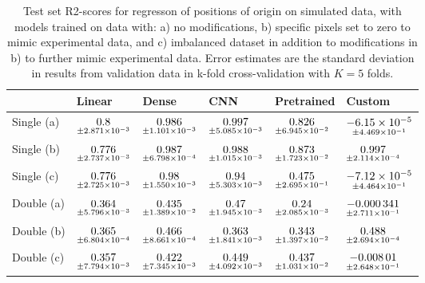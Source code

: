 \begin{table}
\centering
\caption{
Test set R2-scores for regresson of positions of origin on simulated data, with models trained on data with: 
a) no modifications, b) specific pixels set to zero to mimic experimental data, and c) imbalanced dataset
in addition to modifications in b) to further mimic experimental data. Error estimates are the standard deviation 
in results from validation data in k-fold cross-validation with $K=5$ folds.
}
\label{tab:regression-simulated-all-positions-r2}
\begin{tabular}{llllll}
\toprule
{} &                                              Linear &                                               Dense &                                                 CNN &                                          Pretrained &                                                  Custom \\
\midrule
Single (a) &  $\underset{\num{+- 2.871e-03 }  }{\num{ 0.8 } }$ &  $\underset{\num{+- 1.101e-03 }  }{\num{ 0.986 } }$ &  $\underset{\num{+- 5.085e-03 }  }{\num{ 0.997 } }$ &  $\underset{\num{+- 6.945e-02 }  }{\num{ 0.826 } }$ &  $\underset{\num{+- 4.469e-01 }  }{\num{ -6.15e-05 } }$ \\
Single (b) &  $\underset{\num{+- 2.737e-03 }  }{\num{ 0.776 } }$ &  $\underset{\num{+- 6.798e-04 }  }{\num{ 0.987 } }$ &  $\underset{\num{+- 1.015e-03 }  }{\num{ 0.988 } }$ &  $\underset{\num{+- 1.723e-02 }  }{\num{ 0.873 } }$ &  $\underset{\num{+- 2.114e-04 }  }{\num{ 0.997 } }$ \\
Single (c) &  $\underset{\num{+- 2.725e-03 }  }{\num{ 0.776 } }$ &  $\underset{\num{+- 1.550e-03 }  }{\num{ 0.98 } }$ &  $\underset{\num{+- 5.303e-03 }  }{\num{ 0.94 } }$ &  $\underset{\num{+- 2.695e-01 }  }{\num{ 0.475 } }$ &  $\underset{\num{+- 4.464e-01 }  }{\num{ -7.12e-05 } }$ \\
Double (a) &  $\underset{\num{+- 5.796e-03 }  }{\num{ 0.364 } }$ &  $\underset{\num{+- 1.389e-02 }  }{\num{ 0.435 } }$ &  $\underset{\num{+- 1.945e-03 }  }{\num{ 0.47 } }$ &  $\underset{\num{+- 2.085e-03 }  }{\num{ 0.24 } }$ &  $\underset{\num{+- 2.711e-01 }  }{\num{ -0.000341 } }$ \\
Double (b) &  $\underset{\num{+- 6.804e-04 }  }{\num{ 0.365 } }$ &  $\underset{\num{+- 8.661e-04 }  }{\num{ 0.466 } }$ &  $\underset{\num{+- 1.841e-03 }  }{\num{ 0.363 } }$ &  $\underset{\num{+- 1.397e-02 }  }{\num{ 0.343 } }$ &  $\underset{\num{+- 2.694e-04 }  }{\num{ 0.488 } }$ \\
Double (c) &  $\underset{\num{+- 7.794e-03 }  }{\num{ 0.357 } }$ &  $\underset{\num{+- 7.345e-03 }  }{\num{ 0.422 } }$ &  $\underset{\num{+- 4.092e-03 }  }{\num{ 0.449 } }$ &  $\underset{\num{+- 1.031e-02 }  }{\num{ 0.437 } }$ &  $\underset{\num{+- 2.648e-01 }  }{\num{ -0.00801 } }$ \\
\bottomrule
\end{tabular}
\end{table}
